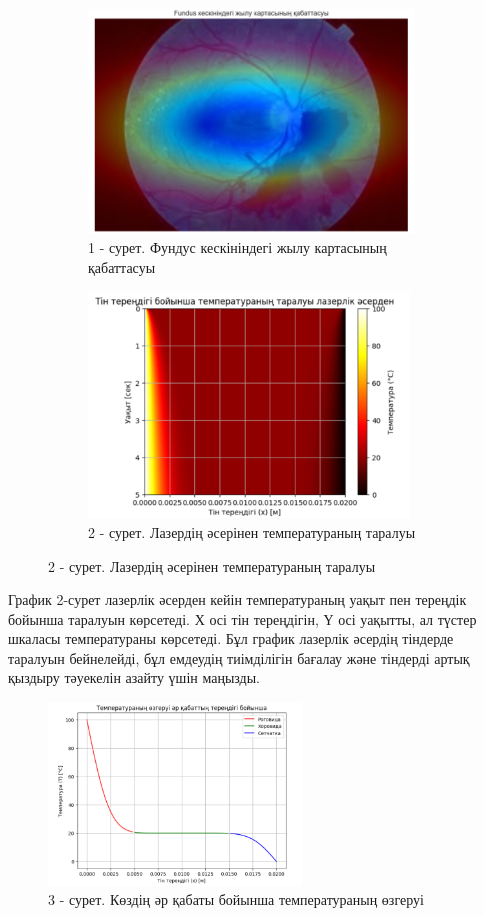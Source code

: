 \begin{figure}[H]
	\centering
	\begin{subfigure}[b]{0.45\textwidth}
		\centering
		\includegraphics[height=6cm]{media/ict/image20}
		\caption*{1 - сурет. Фундус кескініндегі жылу картасының қабаттасуы}
	\end{subfigure}
	\begin{subfigure}[b]{0.45\textwidth}
		\centering
		\includegraphics[height=6cm]{media/ict/image21}
		\caption*{2 - сурет. Лазердің әсерінен температураның таралуы}
	\end{subfigure}
\end{figure}

\begin{multicols}{2}
График 2-сурет лазерлік әсерден кейін температураның уақыт пен тереңдік
бойынша таралуын көрсетеді. Х осі тін тереңдігін, Ү осі уақытты, ал
түстер шкаласы температураны көрсетеді. Бұл график лазерлік әсердің
тіндерде таралуын бейнелейді, бұл емдеудің тиімділігін бағалау және
тіндерді артық қыздыру тәуекелін азайту үшін маңызды.
\end{multicols}

\begin{figure}[H]
	\centering
	\includegraphics[width=0.6\textwidth]{media/ict/image22}
	\caption*{3 - сурет. Көздің әр қабаты бойынша температураның өзгеруі}
\end{figure}

